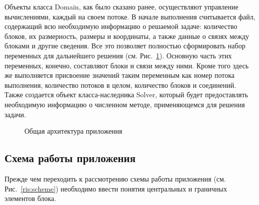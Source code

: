 \documentclass[a4paper, 14pt]{extarticle}
\theoremstyle{definition}
\begin{document}
\par Объекты класса Domain, как было сказано ранее, осуществляют управление вычислениями, каждый на своем потоке. В начале выполнения считывается файл, содержащий всю необходимую информацию о решаемой задаче: количество блоков, их размерность, размеры и координаты, а также данные о связях между блоками и другие сведения. Все это позволяет полностью сформировать набор переменных для дальнейшего решения (см. Рис.~\ref{ris:all}). Основную часть этих переменных, конечно, составляют блоки и связи между ними. Кроме того здесь же выполняется присвоение значений таким переменным как номер потока выполнения, количество потоков в целом, количество блоков и соединений. Также создается объект класса-наследника Solver, который будет предоставлять необходимую информацию о численном методе, применяющемся для решения задачи.
\begin{figure}[h]
	\caption{Общая архитектура приложения}
	\label{ris:all}
\end{figure}

\subsection{Схема работы приложения}

\par Прежде чем переходить к рассмотрению схемы работы приложения (см. Рис.~\ref{ris:scheme}) необходимо ввести понятия центральных и граничных элементов блока.
\end{document}
